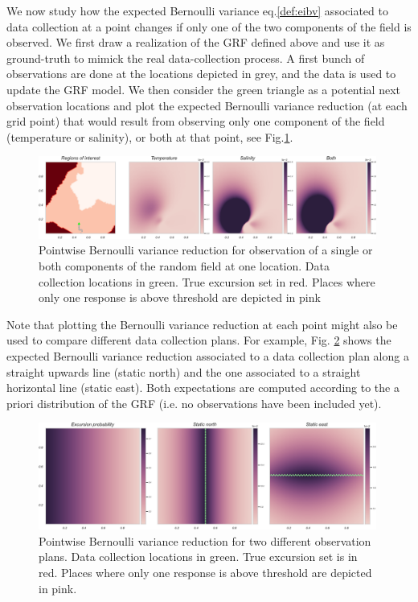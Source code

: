 \documentclass[aoas]{imsart}
\begin{document}
We now study how the expected Bernoulli variance eq.\eqref{def:eibv} associated to data collection at a point changes if only one of the two components of the field is observed. We first draw a realization of the GRF defined above and use it as ground-truth to mimick the real data-collection process. A first bunch of observations are done at the locations depicted in grey, and the data is used to update the GRF model. We then consider the green triangle as a potential next observation locations and plot the expected Bernoulli variance reduction (at each grid point) that would result from observing only one component of the field (temperature or salinity), or both at that point, see Fig.\ref{fig:ebv_comp}.

\begin{figure}[h!] \centering
  \includegraphics[width=0.99\textwidth]{Figures/ebv_comp_2.png}
  \caption{Pointwise Bernoulli variance reduction for observation of a single or both components of the random field at one location. Data collection locations in green. True excursion set in red. Places where only one response is above threshold are depicted in pink}
\label{fig:ebv_comp}
\end{figure}

Note that plotting the Bernoulli variance reduction at each point might also be used to compare different data collection plans. For example, Fig. \ref{fig:ebv_north_vs_east} shows the expected Bernoulli variance reduction associated to a data collection plan along a straight upwards line (static north) and the one associated to a straight horizontal line (static east). Both expectations are computed according to the a priori distribution of the GRF (i.e. no observations have been included yet).

\begin{figure}[h!] \centering
  \includegraphics[width=0.99\textwidth]{Figures/ebv_north_vs_east_2.png}
  \caption{Pointwise Bernoulli variance reduction for two different observation plans. Data collection locations in green. True excursion set is in red. Places where only one response is above threshold are depicted in pink.}
\label{fig:ebv_north_vs_east}
\end{figure}
\end{document}

